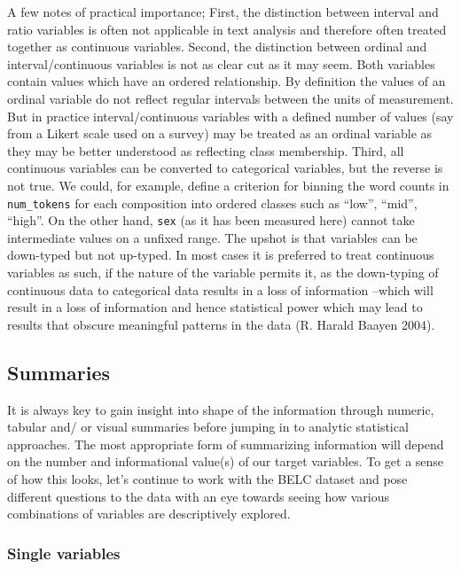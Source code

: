 \documentclass[
  letterpaper,
]{latex/krantz}
\begin{document}
A few notes of practical importance; First, the distinction between
interval and ratio variables is often not applicable in text analysis
and therefore often treated together as continuous variables. Second,
the distinction between ordinal and interval/continuous variables is not
as clear cut as it may seem. Both variables contain values which have an
ordered relationship. By definition the values of an ordinal variable do
not reflect regular intervals between the units of measurement. But in
practice interval/continuous variables with a defined number of values
(say from a Likert scale used on a survey) may be treated as an ordinal
variable as they may be better understood as reflecting class
membership. Third, all continuous variables can be converted to
categorical variables, but the reverse is not true. We could, for
example, define a criterion for binning the word counts in
\texttt{num\_tokens} for each composition into ordered classes such as
``low'', ``mid'', ``high''. On the other hand, \texttt{sex} (as it has
been measured here) cannot take intermediate values on a unfixed range.
The upshot is that variables can be down-typed but not up-typed. In most
cases it is preferred to treat continuous variables as such, if the
nature of the variable permits it, as the down-typing of continuous data
to categorical data results in a loss of information --which will result
in a loss of information and hence statistical power which may lead to
results that obscure meaningful patterns in the data (R. Harald Baayen
2004).

\hypertarget{summaries}{%
\subsection{Summaries}\label{summaries}}

It is always key to gain insight into shape of the information through
numeric, tabular and/ or visual summaries before jumping in to analytic
statistical approaches. The most appropriate form of summarizing
information will depend on the number and informational value(s) of our
target variables. To get a sense of how this looks, let's continue to
work with the BELC dataset and pose different questions to the data with
an eye towards seeing how various combinations of variables are
descriptively explored.

\hypertarget{single-variables}{%
\subsubsection{Single variables}\label{single-variables}}
\end{document}
